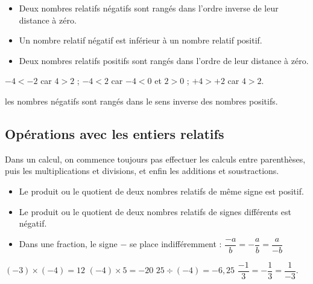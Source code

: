 \medskip

\begin{propriete}[Comparaison]
   \begin{itemize}
      \item Deux nombres relatifs négatifs sont rangés dans l'ordre inverse de leur
distance à zéro.
      \item Un nombre relatif négatif est inférieur à un nombre relatif positif.
      \item Deux nombres relatifs positifs sont rangés dans l'ordre de leur distance à zéro. \\ [-8mm]
   \end{itemize}  
\end{propriete}

\begin{exemple*1}
   $-4<-2$ car $4>2$ \qquad ; \quad $-4<2$ car $-4<0$ et $2>0$ \qquad ; \quad $+4>+2$ car $4>2$.
\end{exemple*1}

\smallskip

\begin{remarque}
   les nombres négatifs sont rangés \og dans le sens inverse \fg{} des nombres positifs.
\end{remarque}


\subsection{Opérations avec les entiers relatifs} %

Dans un calcul, on commence toujours pas effectuer les calculs entre parenthèses, puis les multiplications et divisions, et enfin les additions et soustractions.

\begin{propriete}[Signe]
   \begin{itemize}
      \item Le produit ou le quotient de deux nombres relatifs de même signe est positif.
      \item Le produit ou le quotient de deux nombres relatifs de signes différents est négatif. \smallskip
      \item Dans une fraction, le signe \og $-$ \fg{} se place indifféremment : $\dfrac{-a}{b} =-\dfrac{a}{b} =\dfrac{a}{-b}$ \\ [-6mm]
   \end{itemize}
\end{propriete}

\begin{exemple*1}
      $(-3)\times(-4)= 12$ \qquad $(-4)\times5= -20$ \qquad $25\div(-4)= -6,25$ \qquad $\dfrac{-1}{3} =-\dfrac{1}{3} =\dfrac{1}{-3}$.
\end{exemple*1}


